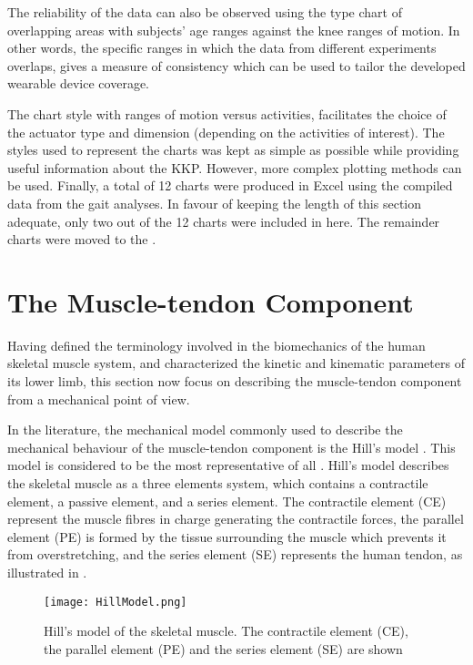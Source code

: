The reliability of the data can also be observed using the type chart of overlapping areas with subjects' age ranges against the knee ranges of motion. In other words, the specific ranges in which the data from different experiments overlaps, gives a measure of consistency which can be used to tailor the developed wearable device coverage. 

The chart style with ranges of motion versus activities, facilitates the choice of the actuator type and dimension (depending on the activities of interest). The styles used to represent the charts was kept as simple as possible while providing useful information about the KKP. However, more complex plotting methods can be used. Finally, a total of 12 charts were produced in Excel\textregistered{} using the compiled data from the gait analyses. In favour of keeping the length of this section adequate, only two out of the 12 charts were included in here. The remainder charts were moved to the .

\section{The Muscle-tendon Component} \label{sec:muscle_tendon}

Having defined the terminology involved in the biomechanics of the human skeletal muscle system, and characterized the kinetic and kinematic parameters of its lower limb, this section now focus on describing the muscle-tendon component from a mechanical point of view. 

In the literature, the mechanical model commonly used to describe the mechanical behaviour of the muscle-tendon component is the Hill's model \cite{hill1938heat}. This model is considered to be the most representative of all \cite{zhang2012sma}. Hill's model describes the skeletal muscle as a three elements system, which contains a contractile element, a passive element, and a series element. The contractile element (CE) represent the muscle fibres in charge generating the contractile forces, the parallel element (PE) is formed by the tissue surrounding the muscle which prevents it from overstretching, and the series element (SE) represents the human tendon, as illustrated in .

\begin{figure}[htb!]
    \centering
    \texttt{[image: HillModel.png]}
    \caption{Hill's model of the skeletal muscle. The contractile element (CE), the parallel element (PE) and the series element (SE) are shown \cite{hill1938heat} }
    \label{fig:hillModel}
\end{figure}

